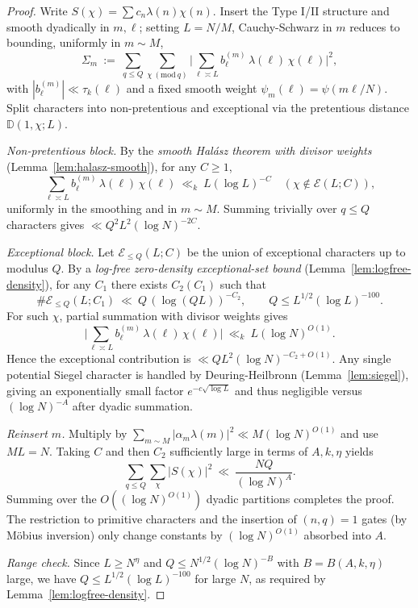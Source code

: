 \documentclass[11pt]{article}
\theoremstyle{definition}
\theoremstyle{remark}
\numberwithin{equation}{part}
\begin{document}
\begin{proof}
	Write $S(\chi)=\sum c_n\lambda(n)\chi(n)$. Insert the Type I/II structure and smooth dyadically in $m,\ell$; setting $L=N/M$, Cauchy-Schwarz in $m$ reduces to bounding, uniformly in $m\sim M$,
	\[
		\Sigma_m\ :=\ \sum_{q\le Q}\sum_{\chi\ (\mathrm{mod}\ q)}\Big|\sum_{\ell\asymp L} b^{(m)}_\ell\,\lambda(\ell)\,\chi(\ell)\Big|^2,
	\]
	with $|b^{(m)}_\ell|\ll\tau_k(\ell)$ and a fixed smooth weight $\psi_m(\ell)=\psi(m\ell/N)$. Split characters into non-pretentious and exceptional via the pretentious distance $\mathbb D(1,\chi;L)$.

	\emph{Non-pretentious block.} By the \emph{smooth Hal\'asz theorem with divisor weights} (Lemma~\ref{lem:halasz-smooth}), for any $C\ge 1$,
	\[
		\sum_{\ell\asymp L} b^{(m)}_\ell\,\lambda(\ell)\,\chi(\ell)\ \ll_{k}\ L(\log L)^{-C}
		\quad(\chi\notin\mathcal E(L;C)),
	\]
	uniformly in the smoothing and in $m\sim M$. Summing trivially over $q\le Q$ characters gives $\ll Q^2 L^2(\log N)^{-2C}$.

	\emph{Exceptional block.} Let $\mathcal E_{\le Q}(L;C)$ be the union of exceptional characters up to modulus $Q$. By a \emph{log-free zero-density exceptional-set bound} (Lemma~\ref{lem:logfree-density}), for any $C_1$ there exists $C_2(C_1)$ such that
	\[
		\#\mathcal E_{\le Q}(L;C_1)\ \ll\ Q\,(\log (QL))^{-C_2},\qquad Q\le L^{1/2}(\log L)^{-100}.
	\]
	For such $\chi$, partial summation with divisor weights gives
	\[
		\Big|\sum_{\ell\asymp L} b^{(m)}_\ell\,\lambda(\ell)\,\chi(\ell)\Big|\ \ll_{k}\ L(\log N)^{O(1)}.
	\]
	Hence the exceptional contribution is $\ll Q L^2 (\log N)^{-C_2+O(1)}$. Any single potential Siegel character is handled by Deuring-Heilbronn (Lemma~\ref{lem:siegel}), giving an exponentially small factor $e^{-c\sqrt{\log L}}$ and thus negligible versus $(\log N)^{-A}$ after dyadic summation.

	\emph{Reinsert $m$.} Multiply by $\sum_{m\sim M}|\alpha_m\lambda(m)|^2\ll M(\log N)^{O(1)}$ and use $ML=N$. Taking $C$ and then $C_2$ sufficiently large in terms of $A,k,\eta$ yields
	\[
		\sum_{q\le Q}\sum_{\chi}|S(\chi)|^2\ \ll\ \frac{NQ}{(\log N)^A}.
	\]
	Summing over the $O((\log N)^{O(1)})$ dyadic partitions completes the proof. The restriction to primitive characters and the insertion of $(n,q)=1$ gates (by M\"obius inversion) only change constants by $(\log N)^{O(1)}$ absorbed into $A$.

	\emph{Range check.} Since $L\ge N^{\eta}$ and $Q\le N^{1/2}(\log N)^{-B}$ with $B=B(A,k,\eta)$ large, we have $Q\le L^{1/2}(\log L)^{-100}$ for large $N$, as required by Lemma~\ref{lem:logfree-density}.
\end{proof}
\end{document}
